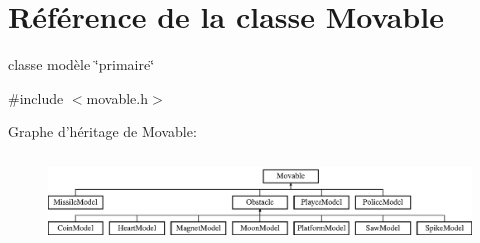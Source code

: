 \hypertarget{class_movable}{\section{Référence de la classe Movable}
\label{class_movable}
}


classe modèle \char`\"{}primaire\char`\"{}  




{\ttfamily \#include $<$movable.\+h$>$}

Graphe d'héritage de Movable\+:\begin{figure}[H]
\begin{center}
\leavevmode
\includegraphics[height=2.376238cm]{class_movable}
\end{center}
\end{figure}
